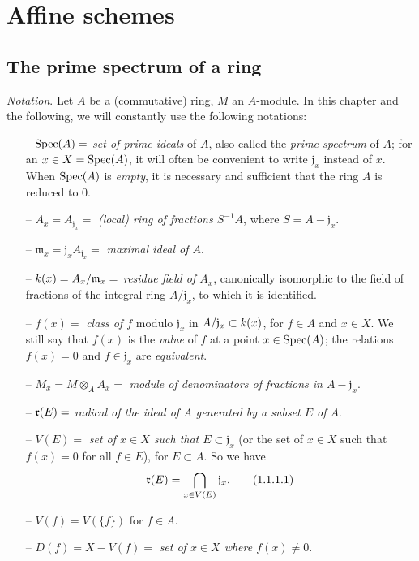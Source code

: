\setcounter{section}{0}
\section{Affine schemes}
\label{section-affine-schemes}

\setcounter{subsection}{0}
\subsection{The prime spectrum of a ring}
\label{subsection-prime-spec}

\begin{env}[1.1.1]
\label{env-1.1.1.1}
{\it Notation}. Let $A$ be a (commutative) ring, $M$ an $A$-module. In
this chapter and the following, we will constantly use the following notations:
\begin{itemize}
  \item[--] ${\mathop{\mathrm{Spec}}\nolimits}(A)=$ {\it set of prime ideals} of $A$, also called the
        {\it prime spectrum} of $A$; for an $x\in X={\mathop{\mathrm{Spec}}\nolimits}(A)$, it will often be
        convenient to write $\mathfrak{j}_x$ instead of $x$. When ${\mathop{\mathrm{Spec}}\nolimits}(A)$ is
        {\it empty}, it is necessary and sufficient that the ring $A$ is
        reduced to $0$.
  \item[--] $A_x=A_{\mathfrak{j}_x}=$ {\it (local) ring of fractions $S^{-1}A$},
        where $S=A-\mathfrak{j}_x$.
  \item[--] $\mathfrak{m}_x=\mathfrak{j}_x A_{\mathfrak{j}_x}=$ {\it maximal ideal
        of $A$}.
  \item[--] $k(x)=A_x/\mathfrak{m}_x=$ {\it residue field of $A_x$},
        canonically isomorphic to the field of fractions
        of the integral ring $A/\mathfrak{j}_x$, to which it is identified.
  \item[--] $f(x)=$ {\it class of $f$} modulo $\mathfrak{j}_x$ in
        $A/\mathfrak{j}_x\subset k(x)$,
        for $f\in A$ and $x\in X$. We still say that $f(x)$ is the {\it value}
        of $f$ at a point $x\in{\mathop{\mathrm{Spec}}\nolimits}(A)$; the relations $f(x)=0$ and
        $f\in\mathfrak{j}_x$ are {\it equivalent}.
  \item[--] $M_x=M\otimes_A A_x=$ {\it module of denominators of fractions in
        $A-\mathfrak{j}_x$}.
  \item[--] $\mathfrak{r}(E)=$ {\it radical of the ideal of $A$ generated by a subset $E$
        of $A$}.
  \item[--] $V(E)=$ {\it set of $x\in X$ such that $E\subset\mathfrak{j}_x$} (or
        the set of
        $x\in X$ such that $f(x)=0$ for all $f\in E$), for $E\subset A$. So we
        have
        \[
          \mathfrak{r}(E)=\bigcap_{x\in V(E)}\mathfrak{j}_x.
          \tag{1.1.1.1}
        \]
  \item[--] $V(f)=V(\{f\})$ for $f\in A$.
  \item[--] $D(f)=X-V(f)=$ {\it set of $x\in X$ where $f(x)\neq 0$}.
\end{itemize}
\end{env}

